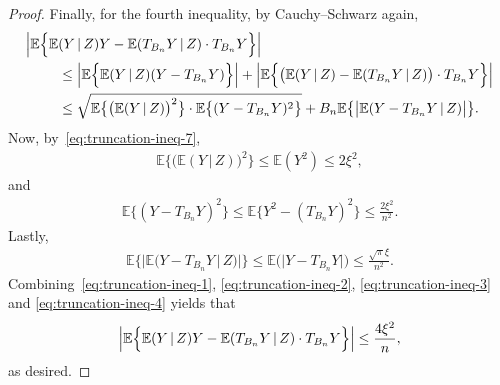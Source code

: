 \documentclass[12pt]{article}
\begin{document}
\begin{proof}
    Finally, for the fourth inequality, by Cauchy--Schwarz again,
    \begin{align}
        \Bigl|\mathbb{E}\Bigl\{\mathbb{E}&(Y\,|\,Z)Y - \mathbb{E}(T_{B_n}Y\,|\,Z) \cdot T_{B_n}Y\Bigr\}\Bigr|\nonumber\\
        &\leq \Bigl|\mathbb{E}\Bigl\{\mathbb{E}(Y\,|\,Z)(Y-T_{B_n}Y)\Bigr\}\Bigr| + \Bigl|\mathbb{E}\Bigl\{\bigl( \mathbb{E}(Y\,|\,Z)-\mathbb{E}(T_{B_n}Y\,|\,Z) \bigr) \cdot T_{B_n}Y\Bigr\}\Bigr| \nonumber\\
        &\leq \sqrt{\mathbb{E}\bigl\{\bigl(\mathbb{E}(Y\,|\,Z)\bigr)^2\bigr\}\cdot \mathbb{E}\bigl\{(Y-T_{B_n}Y)^2\bigr\}} + B_n \mathbb{E}\bigl\{ \bigl| \mathbb{E}(Y - T_{B_n}Y\,|\,Z) \bigr| \bigr\}. \label{eq:truncation-ineq-1}
    \end{align}
    Now, by~\eqref{eq:truncation-ineq-7},
    \begin{align}
        \mathbb{E}\bigl\{\bigl(\mathbb{E}(Y\,|\,Z)\bigr)^2\bigr\} \leq \mathbb{E}(Y^2) \leq 2\xi^2, \label{eq:truncation-ineq-2}
    \end{align} 
    and
    \begin{align}
        \mathbb{E}\bigl\{(Y-T_{B_n}Y)^2\bigr\} \leq \mathbb{E}\bigl\{Y^2-(T_{B_n}Y)^2\bigr\} \leq \frac{2\xi^2}{n^2}. \label{eq:truncation-ineq-3}
    \end{align}
    Lastly,
    \begin{align}
        \mathbb{E}\bigl\{ \bigl| \mathbb{E}(Y - T_{B_n}Y\,|\,Z) \bigr| \bigr\} \leq \mathbb{E}\bigl(|Y - T_{B_n}Y|\bigr) \leq \frac{\sqrt{\pi}\xi}{n^2}. \label{eq:truncation-ineq-4}
    \end{align}
    Combining~\eqref{eq:truncation-ineq-1}, \eqref{eq:truncation-ineq-2}, \eqref{eq:truncation-ineq-3} and \eqref{eq:truncation-ineq-4} yields that
    \begin{align*}
        \Bigl|\mathbb{E}\Bigl\{\mathbb{E}(Y\,|\,Z)Y - \mathbb{E}(T_{B_n}Y\,|\,Z) \cdot T_{B_n}Y\Bigr\}\Bigr| \leq \frac{4\xi^2}{n},
    \end{align*}
    as desired.
\end{proof}
\end{document}

